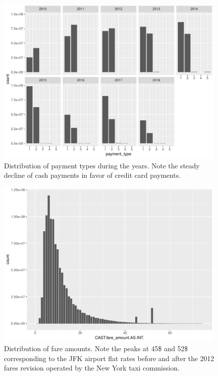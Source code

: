 \documentclass{acm_proc_article-sp-sigmod09}
\begin{document}
\begin{figure}
	\centering
	\includegraphics[width=1\columnwidth]{resources/base_plots/payment_type_distr.pdf}
	\caption{Distribution of payment types during the years. Note the steady decline of cash payments in favor of credit card payments.}
	\label{fig:paymentTypeByYear}
\end{figure}

\begin{figure}
	\centering
	\includegraphics[width=1\columnwidth]{resources/base_plots/fare_amount_distr.pdf}
	\caption{Distribution of fare amounts. Note the peaks at 45\$ and 52\$ corresponding to the JFK airport flat rates before and after the 2012 fares revision operated by the New York taxi commission.}
	\label{fig:fareAmountDistr}
\end{figure}
\end{document}
